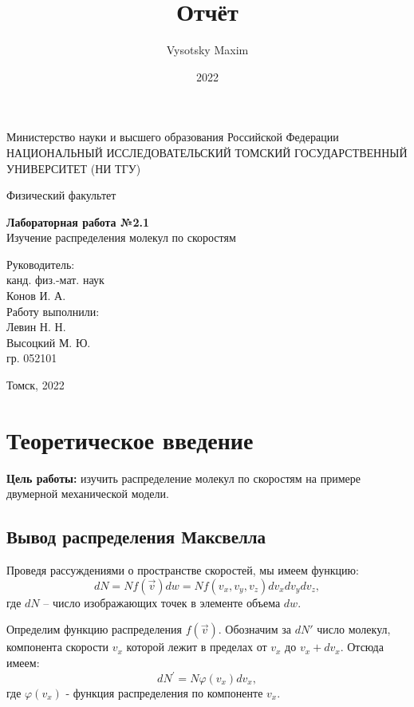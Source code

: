 \documentclass[a4paper,12pt]{article}
\author{Vysotsky Maxim}
\title{Отчёт}
\date{2022}
\begin{document}
	\begin{titlepage}
		\begin{center}
			{Министерство науки и высшего образования Российской Федерации
				НАЦИОНАЛЬНЫЙ ИССЛЕДОВАТЕЛЬСКИЙ ТОМСКИЙ
				ГОСУДАРСТВЕННЫЙ УНИВЕРСИТЕТ (НИ ТГУ)}
		\end{center}
		\begin{center}
			{Физический факультет}
		\end{center}
		
		
		\vspace{8cm}
		{
			\begin{center}
				{\bf Лабораторная работа №2.1}\\
				Изучение распределения молекул по скоростям
			\end{center}
		}
		\vspace{2cm}
		\begin{flushright}
			{Руководитель:\\ канд. физ.-мат. наук\\
				Конов И. А. \\
				Работу выполнили:\\
				Левин Н. Н. \\
				Высоцкий М. Ю.\\
				\vspace{0.2cm}
				гр. 052101}
		\end{flushright}
		\vspace{3cm}
		\begin{center}
			Томск, 2022
		\end{center}
	\end{titlepage}

\section{Теоретическое введение}
\textbf{Цель работы:} изучить распределение молекул по скоростям на примере двумерной механической модели.
\subsection{Вывод распределения Максвелла}
Проведя рассуждениями о пространстве скоростей, мы имеем функцию:
\begin{equation}
dN=Nf( \vec v)dw=Nf(v_x, v_y, v_z )dv_x dv_y dv_z,
\end{equation}
где $dN$ – число изображающих точек в элементе объема $dw$.

Определим функцию распределения $f\left(\vec{v}\right)$. Обозначим за $dN'$ число молекул, компонента скорости $v_x$ которой лежит в пределах от $v_x$ до $v_x+dv_x$. Отсюда имеем:
\begin{equation}
dN^\prime=N\varphi\left(v_x \right)dv_x,
\end{equation}
где $\varphi\left(v_x \right)$ - функция распределения по компоненте $v_x$.
\end{document}
